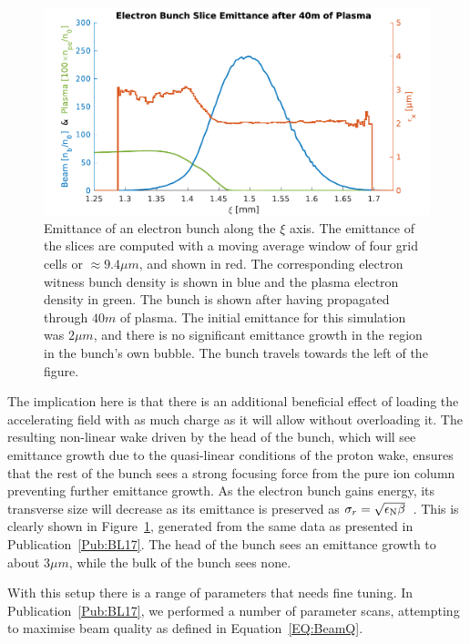 \begin{figure}[hbt]
    \centering
    \includegraphics[width=0.8125\linewidth]{figures/40mSliceEmittance}
    \caption{\label{Fig:SimA:BL17Emitt}
        Emittance of an electron bunch along the $\xi$ axis.
        The emittance of the slices are computed with a moving average window of four grid cells or $\approx 9.4\unit{\mu m}$, and shown in red.
        The corresponding electron witness bunch density is shown in blue and the plasma electron density in green.
        The bunch is shown after having propagated through $40\unit{m}$ of plasma.
        The initial emittance for this simulation was $2\unit{\mu m}$, and there is no significant emittance growth in the region in the bunch's own bubble.
        The bunch travels towards the left of the figure.
    }
\end{figure}

The implication here is that there is an additional beneficial effect of loading the accelerating field with as much charge as it will allow without overloading it.
The resulting non-linear wake driven by the head of the bunch, which will see emittance growth due to the quasi-linear conditions of the proton wake, ensures that the rest of the bunch sees a strong focusing force from the pure ion column preventing further emittance growth.
As the electron bunch gains energy, its transverse size will decrease as its emittance is preserved as $\sigma_{r} = \sqrt{\epsilon_{\mathrm{N}}\beta}$~\cite{wille:2001}.
This is clearly shown in Figure~\ref{Fig:SimA:BL17Emitt}, generated from the same data as presented in Publication~\ref{Pub:BL17}.
The head of the bunch sees an emittance growth to about $3\unit{\mu m}$, while the bulk of the bunch sees none.

With this setup there is a range of parameters that needs fine tuning.
In Publication~\ref{Pub:BL17}, we performed a number of parameter scans, attempting to maximise beam quality as defined in Equation~\ref{EQ:BeamQ}.

